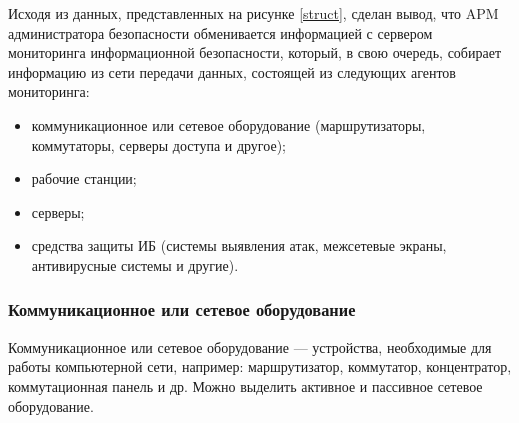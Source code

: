Исходя из данных, представленных на рисунке \ref{struct}, сделан вывод, что APM администратора безопасности обменивается информацией с сервером мониторинга информационной безопасности, который, в свою очередь, собирает информацию из сети передачи данных, состоящей из следующих агентов мониторинга:
\begin{itemize}
    \item коммуникационное или сетевое оборудование (маршрутизаторы, коммутаторы, серверы доступа и другое);
    \item рабочие станции;
    \item серверы;
    \item средства защиты ИБ (системы выявления атак, межсетевые экраны, антивирусные системы и другие).
\end{itemize}

\subsubsection{Коммуникационное или сетевое оборудование}
Коммуникационное или сетевое оборудование --- устройства, необходимые для работы компьютерной сети, например: маршрутизатор, коммутатор, концентратор, коммутационная панель и др. Можно выделить активное и пассивное сетевое оборудование.

